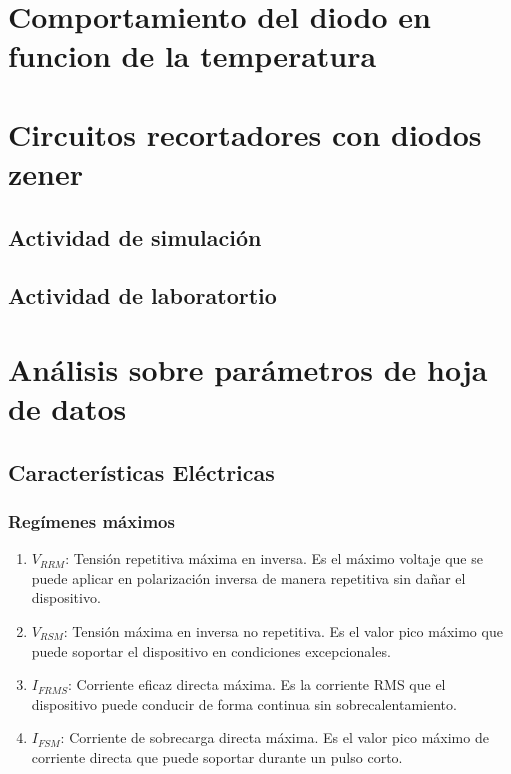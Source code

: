 \documentclass[chaptersright]{informeutn}
\begin{document}
\chapter{Comportamiento del diodo en funcion de la temperatura}

\chapter{Circuitos recortadores con diodos zener}

  \section{Actividad de simulación}
  
  \section{Actividad de laboratortio}

\chapter{Análisis sobre parámetros de hoja de datos}

  \section*{Características Eléctricas}
  
    \subsection*{Regímenes máximos}
      \begin{enumerate}
        \item $V_{RRM}$: Tensión repetitiva máxima en inversa. Es el máximo voltaje que se puede aplicar en polarización inversa de manera repetitiva sin dañar el dispositivo.
        \item $V_{RSM}$: Tensión máxima en inversa no repetitiva. Es el valor pico máximo que puede soportar el dispositivo en condiciones excepcionales.
        \item $I_{FRMS}$: Corriente eficaz directa máxima. Es la corriente RMS que el dispositivo puede conducir de forma continua sin sobrecalentamiento.
        \item $I_{FSM}$: Corriente de sobrecarga directa máxima. Es el valor pico máximo de corriente directa que puede soportar durante un pulso corto.
      \end{enumerate}
    
\end{document}
